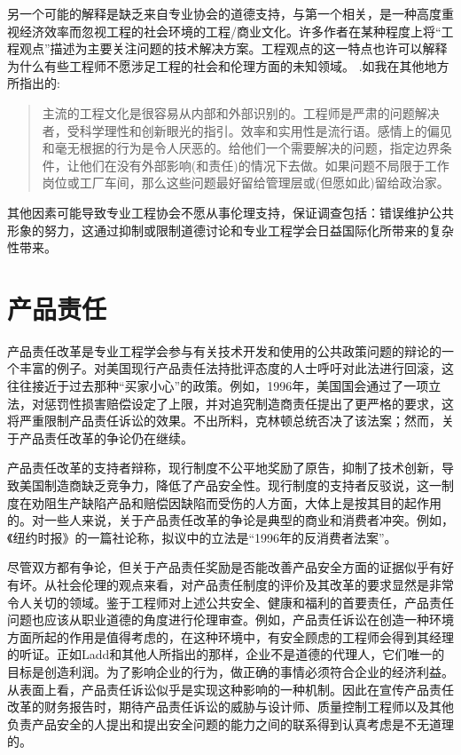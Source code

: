 \documentclass[lang=cn,11pt,a4paper]{elegantpaper}
\begin{document}
另一个可能的解释是缺乏来自专业协会的道德支持，与第一个相关，是一种高度重视经济效率而忽视工程的社会环境的工程/商业文化。许多作者在某种程度上将“工程观点”描述为主要关注问题的技术解决方案。工程观点的这一特点也许可以解释为什么有些工程师不愿涉足工程的社会和伦理方面的未知领域。\cite{9} .如我在其他地方所指出的:\cite{20}
\begin{quotation}
  主流的工程文化是很容易从内部和外部识别的。工程师是严肃的问题解决者，受科学理性和创新眼光的指引。效率和实用性是流行语。感情上的偏见和毫无根据的行为是令人厌恶的。给他们一个需要解决的问题，指定边界条件，让他们在没有外部影响(和责任)的情况下去做。如果问题不局限于工作岗位或工厂车间，那么这些问题最好留给管理层或(但愿如此)留给政治家。
\end{quotation}

其他因素可能导致专业工程协会不愿从事伦理支持，保证调查包括：错误维护公共形象的努力，这通过抑制或限制道德讨论和专业工程学会日益国际化所带来的复杂性带来。

\section{产品责任\cite{2,9}}
产品责任改革是专业工程学会参与有关技术开发和使用的公共政策问题的辩论的一个丰富的例子\cite{9}。对美国现行产品责任法持批评态度的人士呼吁对此法进行回滚，这往往接近于过去那种“买家小心”的政策。例如，1996年，美国国会通过了一项立法，对惩罚性损害赔偿设定了上限，并对追究制造商责任提出了更严格的要求，这将严重限制产品责任诉讼的效果。不出所料，克林顿总统否决了该法案\cite{21}；然而，关于产品责任改革的争论仍在继续。

产品责任改革的支持者辩称，现行制度不公平地奖励了原告，抑制了技术创新，导致美国制造商缺乏竞争力，降低了产品安全性。现行制度的支持者反驳说，这一制度在劝阻生产缺陷产品和赔偿因缺陷而受伤的人方面，大体上是按其目的起作用的\cite{22}。对一些人来说，关于产品责任改革的争论是典型的商业和消费者冲突。例如，《纽约时报》的一篇社论称\cite{23}，拟议中的立法是“1996年的反消费者法案”。

尽管双方都有争论，但关于产品责任奖励是否能改善产品安全方面的证据似乎有好有坏。\cite{22}从社会伦理的观点来看，对产品责任制度的评价及其改革的要求显然是非常令人关切的领域。鉴于工程师对上述公共安全、健康和福利的首要责任，产品责任问题也应该从职业道德的角度进行伦理审查。例如，产品责任诉讼在创造一种环境方面所起的作用是值得考虑的，在这种环境中，有安全顾虑的工程师会得到其经理的听证。正如Ladd\cite{16}和其他人所指出的那样，企业不是道德的代理人，它们唯一的目标是创造利润。为了影响企业的行为，做正确的事情必须符合企业的经济利益。从表面上看，产品责任诉讼似乎是实现这种影响的一种机制。因此在宣传产品责任改革的财务报告时，期待产品责任诉讼的威胁与设计师、质量控制工程师以及其他负责产品安全的人提出和提出安全问题的能力之间的联系得到认真考虑是不无道理的。    
\end{document}
